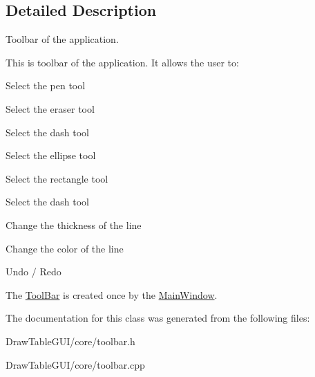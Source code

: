 \subsection{Detailed Description}
Toolbar of the application. 

This is toolbar of the application. It allows the user to\+:
\begin{DoxyItemize}
\item Select the pen tool
\item Select the eraser tool
\item Select the dash tool
\item Select the ellipse tool
\item Select the rectangle tool
\item Select the dash tool
\item Change the thickness of the line
\item Change the color of the line
\item Undo / Redo
\end{DoxyItemize}

The \hyperlink{classToolBar}{Tool\+Bar} is created once by the \hyperlink{classMainWindow}{Main\+Window}. 

The documentation for this class was generated from the following files\+:\begin{DoxyCompactItemize}
\item 
Draw\+Table\+G\+U\+I/core/toolbar.\+h\item 
Draw\+Table\+G\+U\+I/core/toolbar.\+cpp\end{DoxyCompactItemize}
